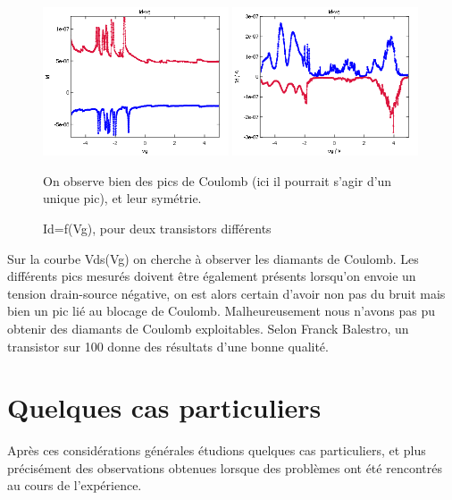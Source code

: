 \begin{figure}[h]
    \begin{center}
        \includegraphics[width=0.49\textwidth]{Images/4_Image_Blocage_Coulomb_1.png}
        \includegraphics[width=0.49\textwidth]{Images/4_Image_Blocage_Coulomb_2.png}
        \caption{Id=f(Vg), pour deux transistors différents}
         On observe bien des pics de Coulomb (ici il pourrait s'agir d'un unique pic), et leur symétrie.
    \end{center}
\end{figure}


Sur la courbe Vds(Vg) on cherche à observer les diamants de Coulomb. Les différents pics mesurés doivent être également présents lorsqu'on envoie un tension drain-source négative, on est alors certain d'avoir non pas du bruit mais bien un pic lié au blocage de Coulomb.
Malheureusement nous n'avons pas pu obtenir des diamants de Coulomb exploitables. Selon Franck Balestro, un transistor sur 100 donne des résultats d'une bonne qualité.

\section{Quelques cas particuliers}
Après ces considérations générales étudions quelques cas particuliers, et plus précisément des observations obtenues lorsque des problèmes ont été rencontrés au cours de l'expérience.

